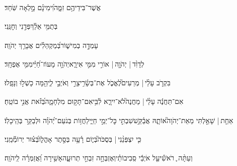 \documentclass[12pt]{article}
\newcommand{\loc}[1]{\textsuperscript{\locf{#1}}}
\begin{document}
{\loc{ י}~}‏אֲשֶׁר־בִּידֵיהֶ֥ם זִמָּ֑ה{\hfill}וִ֝ימִינָ֗ם מָ֣לְאָה שֹּֽׁחַד׃\par

{\loc{ יא}~}‏ בְּתֻמִּ֥י אֵלֵ֗ךְ{\hfill}פְּדֵ֣נִי וְחׇנֵּֽנִי׃\par

{\loc{ יב}~}‏ עָמְדָ֣ה בְמִישׁ֑וֹר{\hfill}בְּ֝מַקְהֵלִ֗ים אֲבָרֵ֥ךְ יְהֹוָֽה׃\par\pend
\ledpb
\pstart[\subsection*{\textcolor{red}{פרק כז}}]\label{פרק כז}
{\loc{ א}~}‏לְדָוִ֨ד | \newline\hspace*{.5em}יְהֹוָ֤ה |  אוֹרִ֣י  מִמִּ֣י אִירָ֑א{\hfill}יְהֹוָ֥ה מָעוֹז־חַ֝יַּ֗י\hspace{1em}מִמִּ֥י אֶפְחָֽד׃\par

{\loc{ ב}~}‏בִּקְרֹ֤ב עָלַ֨י |  מְרֵעִים֮{\hfill}לֶאֱכֹ֢ל אֶת־בְּשָׂ֫רִ֥י\newline\hspace*{.5em}צָרַ֣י וְאֹיְבַ֣י לִ֑י{\hfill}הֵ֖מָּה כָשְׁל֣וּ וְנָפָֽלוּ׃\par

{\loc{ ג}~}‏אִם־תַּחֲנֶ֬ה עָלַ֨י |  מַחֲנֶה֮{\hfill}לֹא־יִירָ֢א לִ֫בִּ֥י\newline\hspace*{.5em}אִם־תָּק֣וּם  מִלְחָמָ֑ה{\hfill}בְּ֝זֹ֗את אֲנִ֣י בוֹטֵֽחַ׃\par

{\loc{ ד}~}‏אַחַ֤ת |  שָׁאַ֣לְתִּי מֵאֵת־יְהֹוָה֮{\hfill}אוֹתָ֢הּ אֲבַ֫קֵּ֥שׁ\newline\hspace*{.5em}שִׁבְתִּ֣י  כׇּל־יְמֵ֣י חַיַּ֑י{\hfill}לַחֲז֥וֹת בְּנֹעַם־יְ֝הֹוָ֗ה וּלְבַקֵּ֥ר בְּהֵֽיכָלֽוֹ׃\par

{\loc{ ה}~}‏כִּ֤י יִצְפְּנֵ֨נִי |  בְּסֻכֹּה֮{\hfill}בְּי֢וֹם רָ֫עָ֥ה\newline\hspace*{.5em} בְּסֵ֣תֶר אָהֳל֑וֹ{\hfill}בְּ֝צ֗וּר יְרוֹמְﬞמֵֽנִי׃\par

{\loc{ ו}~}‏וְעַתָּ֨ה ֪ רֹאשִׁ֡י{\hfill}עַ֤ל אֹיְבַ֬י סְֽבִיבוֹתַ֗י\newline\hspace*{.5em}וְאֶזְבְּחָ֣ה  זִבְחֵ֣י תְרוּעָ֑ה{\hfill}אָשִׁ֥ירָה וַ֝אֲזַמְּרָ֗ה לַֽיהֹוָֽה׃\par
\end{document}
